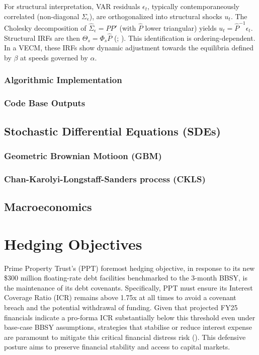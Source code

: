 \documentclass[11pt, a4paper, british]{article}
\begin{document}
For structural interpretation, VAR residuals $\epsilon_t$, typically contemporaneously correlated (non-diagonal $\Sigma_\epsilon$), are orthogonalized into structural shocks $u_t$. The Cholesky decomposition of $\hat{\Sigma}_\epsilon = \hat{P}\hat{P}'$ (with $\hat{P}$ lower triangular) yields $u_t = \hat{P}^{-1}\epsilon_t$. Structural IRFs are then $\Theta_s = \Phi_s \hat{P}$ (\cite{s}; \cite{l}). This identification is ordering-dependent. In a VECM, these IRFs show dynamic adjustment towards the equilibria defined by $\beta$ at speeds governed by $\alpha$.

\subsubsection{Algorithmic Implementation}

\newpage

\subsubsection{Code Base Outputs}

\newpage

\subsection{Stochastic Differential Equations (SDEs)}

\subsubsection{Geometric Brownian Motioon (GBM)}

\newpage

\subsubsection{Chan-Karolyi-Longstaff-Sanders process (CKLS)}


\newpage

\subsection{Macroeconomics}

\newpage

\section{Hedging Objectives}

Prime Property Trust’s (PPT) foremost hedging objective, in response to its new \$300 million floating-rate debt facilities benchmarked to the 3-month BBSY, is the maintenance of its debt covenants. Specifically, PPT must ensure its Interest Coverage Ratio (ICR) remains above 1.75x at all times to avoid a covenant breach and the potential withdrawal of funding. Given that projected FY25 financials indicate a pro-forma ICR substantially below this threshold even under base-case BBSY assumptions, strategies that stabilise or reduce interest expense are paramount to mitigate this critical financial distress risk (\cite{ss}). This defensive posture aims to preserve financial stability and access to capital markets.
\end{document}
